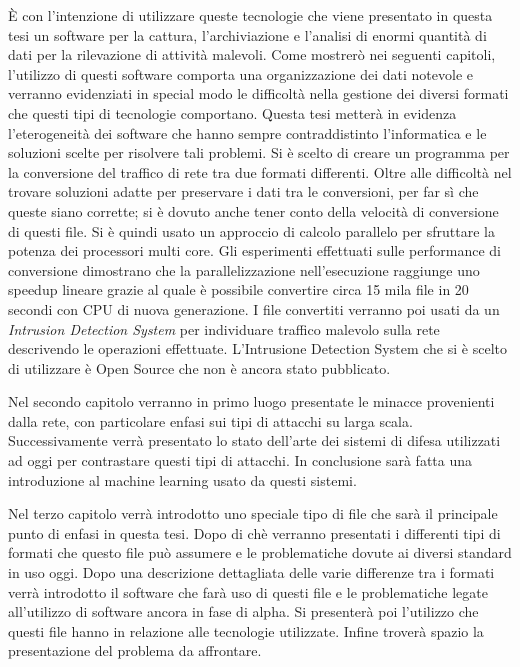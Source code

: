 \documentclass[../main.tex]{subfiles}
\begin{document}
È con l'intenzione di utilizzare queste tecnologie che viene presentato in questa tesi un software per la cattura, l'archiviazione e l'analisi di enormi quantità di dati per la rilevazione di attività malevoli. Come mostrerò nei seguenti capitoli, l'utilizzo di questi software comporta una organizzazione dei dati notevole e verranno evidenziati in special modo le difficoltà nella gestione dei diversi formati che questi tipi di tecnologie comportano. Questa tesi metterà in evidenza l'eterogeneità dei software che hanno sempre contraddistinto l'informatica e le soluzioni scelte per risolvere tali problemi. 
Si è scelto di creare un programma per la conversione del traffico di rete tra due formati differenti. Oltre alle difficoltà nel trovare soluzioni adatte per preservare i dati tra le conversioni, per far sì che queste siano corrette; si è dovuto anche tener conto della velocità di conversione di questi file. Si è quindi usato un approccio di calcolo parallelo per sfruttare la potenza dei processori multi core.
Gli esperimenti effettuati sulle performance di conversione dimostrano che la parallelizzazione nell'esecuzione raggiunge uno speedup lineare grazie al quale è possibile convertire circa 15 mila file in 20 secondi con CPU di nuova generazione.
I file convertiti verranno poi usati da un \textit{Intrusion Detection System} per individuare traffico malevolo sulla rete descrivendo le operazioni effettuate. L'Intrusione Detection System che si è scelto di utilizzare è Open Source che non è ancora stato pubblicato. 

Nel secondo capitolo verranno in primo luogo presentate le minacce provenienti dalla rete, con particolare enfasi sui tipi di attacchi su larga scala. Successivamente verrà presentato lo stato dell'arte dei sistemi di difesa utilizzati ad oggi per contrastare questi tipi di attacchi. In conclusione sarà fatta una introduzione al machine learning usato da questi sistemi.

Nel terzo capitolo verrà introdotto uno speciale tipo di file che sarà il principale punto di enfasi in questa tesi. Dopo di chè verranno presentati i differenti tipi di formati che questo file può assumere e le problematiche dovute ai diversi standard in uso oggi. Dopo una descrizione dettagliata delle varie differenze tra i formati verrà introdotto il software che farà uso di questi file e le problematiche legate all'utilizzo di software ancora in fase di alpha. Si presenterà poi l'utilizzo che questi file hanno in relazione alle tecnologie utilizzate. Infine troverà spazio la presentazione del problema da affrontare.
\end{document}
